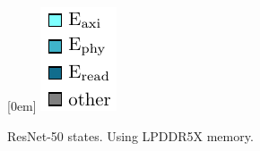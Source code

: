 \begin{figure}[hbtp]
    \centering
    \hfill
    \subcaptionbox*{}[0em]{
        \includegraphics{assets/legend.pdf}
    }
    \hfill
    \caption{ResNet-50 states. Using LPDDR5X memory.}
    \label{fig:resnet50_states_comparison}
\end{figure}